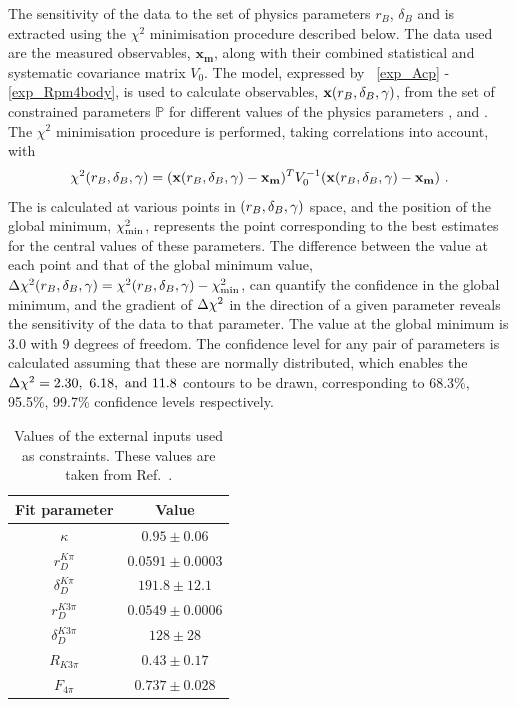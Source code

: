 The sensitivity of the data to the set of physics parameters $r_B$, $\delta_B$ and \Pgamma is extracted using the $\chi^2$ minimisation procedure described below. The data used are the measured \CP observables, $\mathbf{x_m}$, along with their combined statistical and systematic covariance matrix $V_0$. The model, expressed by \eqns~\ref{exp_Acp} - \ref{exp_Rpm4body}, is used to calculate \CP observables, $\mathbf{x}(r_B, \delta_B, \gamma)$, from the set of constrained parameters $\mathbb{P}$ for different values of the physics parameters \rb, \deltab and \Pgamma. The $\chi^2$ minimisation procedure is performed, taking correlations into account, with
\begin{equation}
\chi^2(r_B, \delta_B, \gamma) = (\mathbf{x}(r_B, \delta_B, \gamma) - \mathbf{x_m})^TV_0^{-1}(\mathbf{x}(r_B, \delta_B, \gamma) - \mathbf{x_m}) \text{ .}
\end{equation}
The \chisq is calculated at various points in $\left(r_B, \delta_B, \gamma\right)$ space, and the position of the global minimum, $\chi^2_{\text{min}}$, represents the point corresponding to the best estimates for the central values of these parameters. The difference between the \chisq value at each point and that of the global minimum value, $\Delta\chi^2(r_B, \delta_B, \gamma) = \chi^2(r_B, \delta_B, \gamma) - \chi^2_{\text{min}}$, can quantify the confidence in the global minimum, and the gradient of $\Delta\chi^2$ in the direction of a given parameter reveals the sensitivity of the data to that parameter. The \chisq value at the global minimum is 3.0 with 9 degrees of freedom. The confidence level for any pair of parameters is calculated assuming that these are normally distributed, which enables the $\Delta\chi^2 = 2.30,\ 6.18,\ \text{and } 11.8$ contours to be drawn, corresponding to 68.3\%, 95.5\%,  99.7\% confidence levels respectively.

\begin{table}
\centering
\begin{tabular}{c|c}
\hline
Fit parameter & Value \\
\hline
$\kappa$ & $0.95 \pm 0.06$ \\
$r_D^{K\pi}$ & $0.0591 \pm 0.0003$ \\
$\delta_D^{K\pi}$ & $191.8 \pm 12.1$ \\
$r_D^{K3\pi}$ & $0.0549 \pm 0.0006$ \\
$\delta_D^{K3\pi}$ & $128 \pm 28$ \\
$R_{K3\pi}$ & $0.43 \pm 0.17$ \\
$F_{4\pi}$ & $0.737 \pm 0.028$ \\
\hline
\end{tabular}
\caption{Values of the external inputs used as constraints. These values are taken from Ref.~\cite{HFAG,charmk3pi,charmk3pi_errata,charm4pi}.}
\label{inputparameters}
\end{table}

